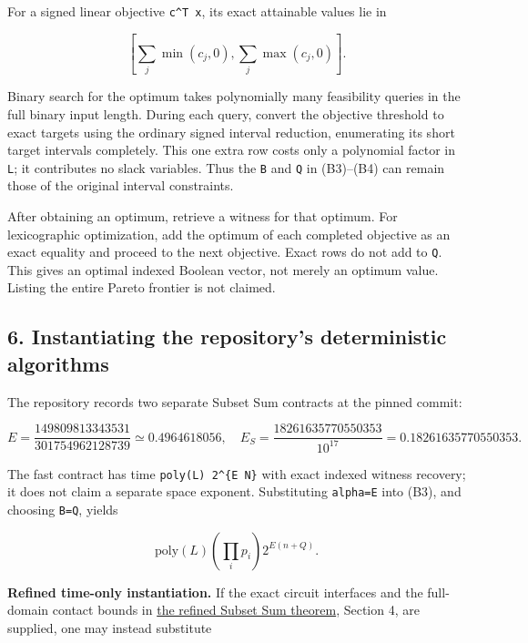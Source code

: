 For a signed linear objective \texttt{c\^{}T\ x}, its exact attainable values lie in

\[
\left[\sum_j\min(c_j,0),\sum_j\max(c_j,0)\right].
\]

Binary search for the optimum takes polynomially many feasibility queries in the full binary input length. During each query, convert the objective threshold to exact targets using the ordinary signed interval reduction, enumerating its short target intervals completely. This one extra row costs only a polynomial factor in \texttt{L}; it contributes no slack variables. Thus the \texttt{B} and \texttt{Q} in (B3)--(B4) can remain those of the original interval constraints.

After obtaining an optimum, retrieve a witness for that optimum. For lexicographic optimization, add the optimum of each completed objective as an exact equality and proceed to the next objective. Exact rows do not add to \texttt{Q}. This gives an optimal indexed Boolean vector, not merely an optimum value. Listing the entire Pareto frontier is not claimed.

\hypertarget{af-77b0bb6793-instantiating-the-repositorys-deterministic-algorithms}{%
\subsection{6. Instantiating the repository's deterministic algorithms}\label{af-77b0bb6793-instantiating-the-repositorys-deterministic-algorithms}}

The repository records two separate Subset Sum contracts at the pinned commit:

\[
E=\frac{149809813343531}{301754962128739}
\simeq0.4964618056,
\quad
E_S=\frac{18261635770550353}{10^{17}}
=0.18261635770550353.
\tag{B14}
\]

The fast contract has time \texttt{poly(L\textquotesingle{})\ 2\^{}\{E\ N\}} with exact indexed witness recovery; it does not claim a separate space exponent. Substituting \texttt{alpha=E} into (B3), and choosing \texttt{B=Q}, yields

\[
\mathrm{poly}(L)\left(\prod_i p_i\right)2^{E(n+Q)}.
\tag{B15}
\]

\textbf{Refined time-only instantiation.} If the exact circuit interfaces and the full-domain contact bounds in \href{https://github.com/icekylinx/algorithm-frontier/blob/main/problems/subset-sum-fast-deterministic/proof.md}{the refined Subset Sum theorem}, Section 4, are supplied, one may instead substitute

